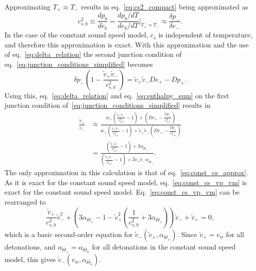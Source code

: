 Approximating $T_+ \approx T_-$ results in eq.~\eqref{eq:cs2_compact} being approximated as
\begin{equation}
c_{s,b}^2
\equiv \frac{dp_b}{de_b}
= \frac{dp_b/dT}{de_b/dT} \big|_{T_+ \approx T_-}
\approx \frac{\delta p_-}{\delta e_-}.
\label{eq:const_cs_approx}
\end{equation}
In the case of the constant sound speed model, $c_{s}$ is independent of temperature, and therefore this approximation is exact.
With this approximation and the use of eq.~\eqref{eq:delta_relation} the second junction condition of eq.~\eqref{eq:junction_conditions_simplified} becomes
\begin{equation}
\delta p_- \left(1 - \frac{\tilde{v}_+ \tilde{v}_-}{c_{s,b}^2} \right) = \tilde{v}_+ \tilde{v}_- De_+ - Dp_+.
\end{equation}
Using this, eq.~\eqref{eq:delta_relation} and eq.~\eqref{eq:enthalpy_sum} on the first junction condition of~\eqref{eq:junction_conditions_simplified} results in
\begin{align}
\frac{\tilde{v}_+}{\tilde{v}_-}
&\approx \frac{
w_+ \left( \frac{\tilde{v}_+ \tilde{v}_-}{c_{s,b}^2} - 1 \right) + \left( De_+ - \frac{Dp_+}{c_{s,b}^2} \right)
}{
w_+ \left( \frac{\tilde{v}_+ \tilde{v}_-}{c_{s,b}^2} - 1 \right) + \tilde{v}_+ \tilde{v}_- \left( De_+ - \frac{Dp_+}{c_{s,b}^2} \right)
} \\
&= \frac{ \left( \frac{\tilde{v}_+ \tilde{v}_-}{c_{s,b}^2} - 1 \right) + 3 \alpha_{\bar{\Theta}_+}
}{
\left( \frac{\tilde{v}_+ \tilde{v}_-}{c_{s,b}^2} - 1 \right) + 3\tilde{v}_+ \tilde{v}_- \alpha_{\bar{\Theta}_+}}.
\label{eq:const_cs_vp_vm}
\end{align}
The only approximation in this calculation is that of eq.~\eqref{eq:const_cs_approx}.
As it is exact for the constant sound speed model,
eq.~\eqref{eq:const_cs_vp_vm} is exact for the constant sound speed model.
Eq.~\eqref{eq:const_cs_vp_vm} can be rearranged to
\begin{equation}
\frac{\tilde{v}_+}{c_{s,b}^2} \tilde{v}_-^2
+ \left(3 \alpha_{\bar{\Theta}_+} - 1 - \tilde{v}_+^2 \left(\frac{1}{c_{s,b}^2} + 3 \alpha_{\bar{\Theta}_+} \right) \right) \tilde{v}_-
+ \tilde{v}_+
= 0,
\end{equation}
which is a basic second-order equation for $\tilde{v}_- ( \tilde{v}_+, \alpha_{\bar{\Theta}_+} )$.
Since $\tilde{v}_+ = v_w$ for all detonations, and $\alpha_{\bar{\Theta}_+} = \alpha_{\bar{\Theta}_n}$ for all detonations in the constant sound speed model, this gives $\tilde{v}_- ( v_w, \alpha_{\bar{\Theta}_n} )$.
